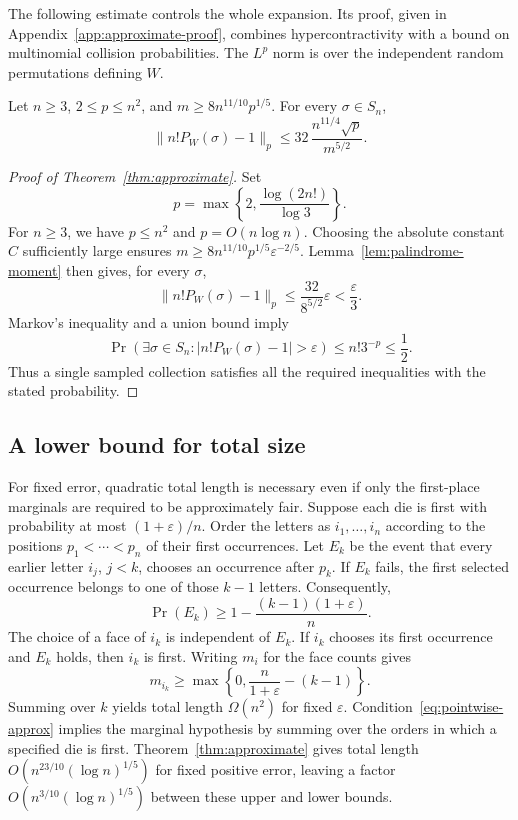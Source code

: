 The following estimate controls the whole expansion.  Its proof, given in
Appendix~\ref{app:approximate-proof}, combines hypercontractivity with a
bound on multinomial collision probabilities.  The $L^p$ norm is over
the independent random permutations defining $W$.

\begin{lemma}\label{lem:palindrome-moment}
Let $n\geq3$, $2\leq p\leq n^2$, and
$m\geq8n^{11/10}p^{1/5}$.  For every $\sigma\in S_n$,
\[
  \bigl\|n!P_W(\sigma)-1\bigr\|_p
  \leq32\,\frac{n^{11/4}\sqrt p}{m^{5/2}}.
\]
\end{lemma}

\begin{proof}[Proof of Theorem~\ref{thm:approximate}]
Set
\[
  p=\max\left\{2,\frac{\log(2n!)}{\log3}\right\}.
\]
For $n\geq3$, we have $p\leq n^2$ and $p=O(n\log n)$.
Choosing the absolute constant $C$ sufficiently large ensures
$m\geq8n^{11/10}p^{1/5}\varepsilon^{-2/5}$.
Lemma~\ref{lem:palindrome-moment} then gives, for every $\sigma$,
\[
  \bigl\|n!P_W(\sigma)-1\bigr\|_p
  \leq\frac{32}{8^{5/2}}\varepsilon<\frac\varepsilon3.
\]
Markov's inequality and a union bound imply
\[
  \Pr\!\left(\exists\sigma\in S_n:
      |n!P_W(\sigma)-1|>\varepsilon\right)
  \leq n!3^{-p}\leq\frac12.
\]
Thus a single sampled collection satisfies all the required inequalities
with the stated probability.
\end{proof}

\subsection{A lower bound for total size}

For fixed error, quadratic total length is necessary even if only the
first-place marginals are required to be approximately fair.  Suppose
each die is first with probability at most $(1+\varepsilon)/n$.
Order the letters as $i_1,\ldots,i_n$ according to the positions
$p_1<\cdots<p_n$ of their first occurrences.  Let $E_k$ be the event
that every earlier letter $i_j$, $j<k$, chooses an occurrence after
$p_k$.  If $E_k$ fails, the first selected occurrence belongs to one
of those $k-1$ letters.  Consequently,
\[
  \Pr(E_k)\geq1-\frac{(k-1)(1+\varepsilon)}n.
\]
The choice of a face of $i_k$ is independent of $E_k$.  If $i_k$
chooses its first occurrence and $E_k$ holds, then $i_k$ is first.
Writing $m_i$ for the face counts gives
\begin{equation}\label{eq:approx-first-lower}
  m_{i_k}\geq
  \max\left\{0,\frac{n}{1+\varepsilon}-(k-1)\right\}.
\end{equation}
Summing over $k$ yields total length $\Omega(n^2)$ for fixed
$\varepsilon$.  Condition~\eqref{eq:pointwise-approx} implies the marginal
hypothesis by summing over the orders in which a specified die is first.
Theorem~\ref{thm:approximate} gives total length
$O(n^{23/10}(\log n)^{1/5})$ for fixed positive error, leaving a factor
$O(n^{3/10}(\log n)^{1/5})$ between these upper and lower bounds.
